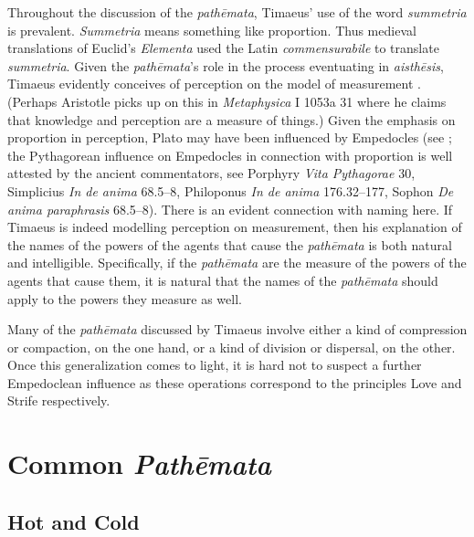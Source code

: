 Throughout the discussion of the \emph{pathēmata}, Timaeus' use of the word \emph{summetria} is prevalent. \emph{Summetria} means something like proportion. Thus medieval translations of Euclid's \emph{Elementa} used the Latin \emph{commensurabile} to translate \emph{summetria}. Given the \emph{pathēmata}'s role in the process eventuating in \emph{aisthēsis}, Timaeus evidently conceives of perception on the model of measurement \citep[155--6]{Brisson:1997qr}. (Perhaps Aristotle picks up on this in \emph{Metaphysica} I 1053a 31 where he claims that knowledge and perception are a measure of things.) Given the emphasis on proportion in perception, Plato may have been influenced by Empedocles (see \citealt{Ierodiakonou:2005fk,Ierodiakonou:2005ly}; the Pythagorean influence on Empedocles in connection with proportion is well attested by the ancient commentators, see Porphyry \emph{Vita Pythagorae} 30, Simplicius \emph{In de anima} 68.5--8, Philoponus \emph{In de anima} 176.32--177, Sophon \emph{De anima paraphrasis} 68.5--8). There is an evident connection with naming here. If Timaeus is indeed modelling perception on measurement, then his explanation of the names of the powers of the agents that cause the \emph{pathēmata} is both natural and intelligible. Specifically, if the \emph{pathēmata} are the measure of the powers of the agents that cause them, it is natural that the names of the \emph{pathēmata} should apply to the powers they measure as well. 

Many of the \emph{pathēmata} discussed by Timaeus involve either a kind of compression or compaction, on the one hand, or a kind of  division or dispersal, on the other. Once this generalization comes to light, it is hard not to suspect a further Empedoclean influence as these operations correspond to the principles Love and Strife respectively.


\section{Common \emph{Pathēmata}} %
\label{sec:common_emph_pathemata}

\subsection{Hot and Cold} %
\label{sub:hot_and_cold}

